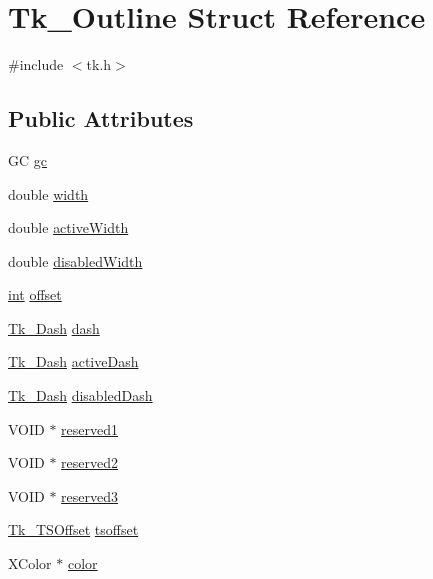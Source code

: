 \hypertarget{struct_tk___outline}{}\section{Tk\+\_\+\+Outline Struct Reference}
\label{struct_tk___outline}


{\ttfamily \#include $<$tk.\+h$>$}

\subsection*{Public Attributes}
\begin{DoxyCompactItemize}
\item 
GC \hyperlink{struct_tk___outline_ab96f1c5c142a4beb60295887384ed97b}{gc}
\item 
double \hyperlink{struct_tk___outline_a7b475a2386ac7bff182f0231673cd609}{width}
\item 
double \hyperlink{struct_tk___outline_a43d738d7c3b9ec91a12a1c14f1088e8d}{active\+Width}
\item 
double \hyperlink{struct_tk___outline_ae82cdf1f56316a49a9ad3ffd726310e5}{disabled\+Width}
\item 
\hyperlink{tk_8h_a83f82f76e7fed06f4c49d2db94028a6d}{int} \hyperlink{struct_tk___outline_aba3bde453130414f6e8aa4f8a43a9920}{offset}
\item 
\hyperlink{struct_tk___dash}{Tk\+\_\+\+Dash} \hyperlink{struct_tk___outline_a2c2f3f26c552cb8b4f35906b552c8f6c}{dash}
\item 
\hyperlink{struct_tk___dash}{Tk\+\_\+\+Dash} \hyperlink{struct_tk___outline_ada5e71c0394238bae873ce2d0bbeb8a0}{active\+Dash}
\item 
\hyperlink{struct_tk___dash}{Tk\+\_\+\+Dash} \hyperlink{struct_tk___outline_a0fc646dff6c4f8e826b3b75a2baa511d}{disabled\+Dash}
\item 
V\+O\+ID $\ast$ \hyperlink{struct_tk___outline_af8b13602a9d770d590642795c402cd81}{reserved1}
\item 
V\+O\+ID $\ast$ \hyperlink{struct_tk___outline_a31ae2768cfa61e05cb7f792a47cb22cd}{reserved2}
\item 
V\+O\+ID $\ast$ \hyperlink{struct_tk___outline_a62836603a85a2d0cfbe1626105c7c8d9}{reserved3}
\item 
\hyperlink{struct_tk___t_s_offset}{Tk\+\_\+\+T\+S\+Offset} \hyperlink{struct_tk___outline_ae94964d53046bb4ad5325b804e62a64d}{tsoffset}
\item 
X\+Color $\ast$ \hyperlink{struct_tk___outline_adba866fbc46298d96b7c52813426329f}{color}

\end{DoxyCompactItemize}
